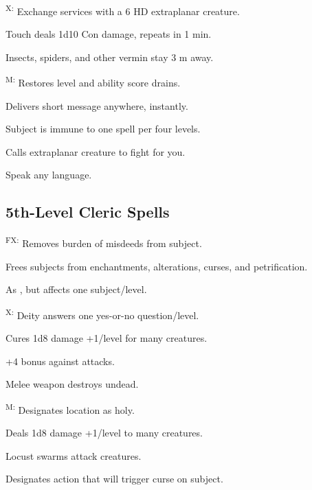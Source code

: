 \textsuperscript{X:} Exchange services with a 6 HD extraplanar creature.

 Touch deals 1d10 Con damage, repeats in 1 min.

 Insects, spiders, and other vermin stay 3 m away.

\textsuperscript{M:} Restores level and ability score drains.

 Delivers short message anywhere, instantly.

 Subject is immune to one spell per four levels.

 Calls extraplanar creature to fight for you.

 Speak any language.



\subsection{5th-Level Cleric Spells}

\textsuperscript{FX:} Removes burden of misdeeds from subject.

 Frees subjects from enchantments, alterations, curses, and petrification.

 As , but affects one subject/level.

\textsuperscript{X:} Deity answers one yes-or-no question/level.

 Cures 1d8 damage +1/level for many creatures.

 +4 bonus against attacks.

 Melee weapon destroys undead.


\textsuperscript{M:} Designates location as holy.

 Deals 1d8 damage +1/level to many creatures.

 Locust swarms attack creatures.

 Designates action that will trigger curse on subject.

